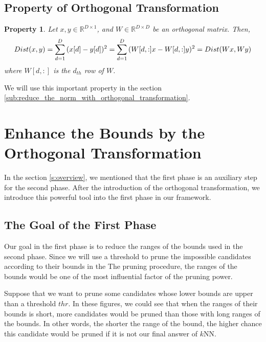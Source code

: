 \subsection{Property of Orthogonal Transformation}
\label{ss:ortho_prop}
\newtheorem{ProOfOrthogonal}{\bf Property}
\begin{ProOfOrthogonal}
Let $x, y\in\mathbb{R}^{D\times 1}$, and $W\in\mathbb{R}^{D\times D}$ be an orthogonal matrix. Then,
\[
Dist(x,y)=\sum^D_{d=1}{(x[d]-y[d])^2} \\
=\sum^D_{d=1}{(W[d,:]x-W[d,:]y)^2}=Dist(Wx,Wy)
\]
where $W[d,:]$ is the $d_{th}$ row of $W$.
\end{ProOfOrthogonal}

We will use this important property in the section \ref{sub:reduce_the_norm_with_orthogonal_transformation}.

\section{Enhance the Bounds by the Orthogonal Transformation}
\label{s:ortho_bounds}
In the section \ref{s:overview}, we mentioned that the first phase is an auxiliary step for the second phase.  After the introduction of the orthogonal transformation, we introduce this powerful tool into the first phase in our framework.

\subsection{The Goal of the First Phase} %
\label{ss:the_goal_of_the_first_phase}

Our goal in the first phase is to reduce the ranges of the bounds used in the second phase.  Since we will use a threshold to prune the impossible candidates according to their bounds in the The pruning procedure, the ranges of the bounds would be one of the most influential factor of the pruning power.



Suppose that we want to prune some candidates whose lower bounds are upper than a threshold $thr$.  In these figures, we could see that when the ranges of their bounds is short, more candidates would be pruned than those with long ranges of the bounds.  In other words, the shorter the range of the bound, the higher chance this candidate would be pruned if it is not our final answer of $k$NN.

